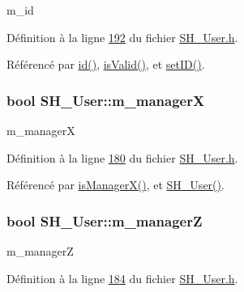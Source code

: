 m\-\_\-id 



Définition à la ligne \hyperlink{SH__User_8h_source_l00192}{192} du fichier \hyperlink{SH__User_8h_source}{S\-H\-\_\-\-User.\-h}.



Référencé par \hyperlink{classSH__User_addf3cb1d491eea2df592dee5c9081d32}{id()}, \hyperlink{classSH__User_a07de5c02b2a02b3bb2b0aaf0886bb4d9}{is\-Valid()}, et \hyperlink{classSH__User_ad3195a7010669a0d007cf95606562eb3}{set\-I\-D()}.

\hypertarget{classSH__User_ab9c9475b85e1449da1476eb7b4157a4d}{
\subsubsection[{m\-\_\-manager\-X}]{\setlength{\rightskip}{0pt plus 5cm}bool S\-H\-\_\-\-User\-::m\-\_\-manager\-X\hspace{0.3cm}{\ttfamily [private]}}}\label{classSH__User_ab9c9475b85e1449da1476eb7b4157a4d}


m\-\_\-manager\-X 



Définition à la ligne \hyperlink{SH__User_8h_source_l00180}{180} du fichier \hyperlink{SH__User_8h_source}{S\-H\-\_\-\-User.\-h}.



Référencé par \hyperlink{classSH__User_af5e5639aa5f7794b5b169f0ed0333268}{is\-Manager\-X()}, et \hyperlink{classSH__User_a96c0ebb3f11c1654935aaecb92295724}{S\-H\-\_\-\-User()}.

\hypertarget{classSH__User_aff16f3d1a135c4b6673b69c42cffe86d}{
\subsubsection[{m\-\_\-manager\-Z}]{\setlength{\rightskip}{0pt plus 5cm}bool S\-H\-\_\-\-User\-::m\-\_\-manager\-Z\hspace{0.3cm}{\ttfamily [private]}}}\label{classSH__User_aff16f3d1a135c4b6673b69c42cffe86d}


m\-\_\-manager\-Z 



Définition à la ligne \hyperlink{SH__User_8h_source_l00184}{184} du fichier \hyperlink{SH__User_8h_source}{S\-H\-\_\-\-User.\-h}.



